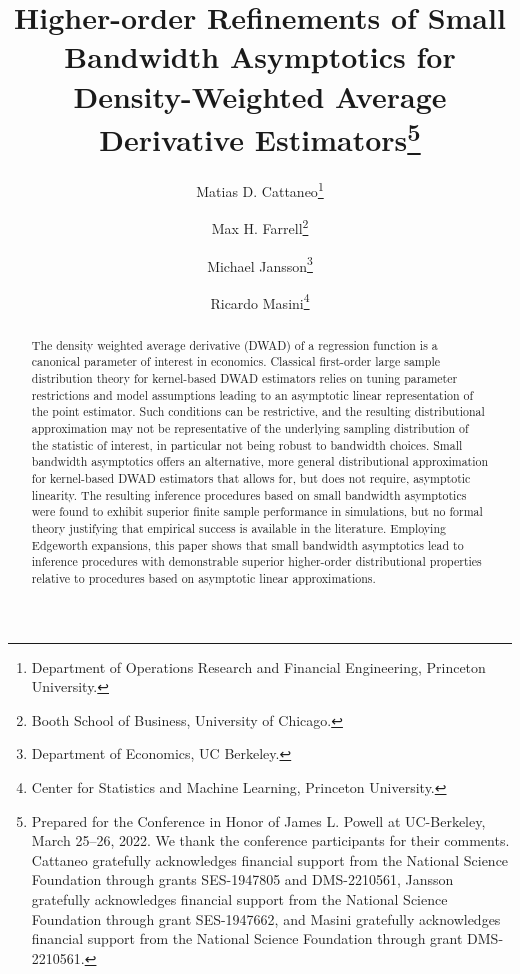 \documentclass[11pt]{article}
\numberwithin{equation}{section}
\theoremstyle{definition}
\begin{document}
\title{\vspace{-0.0in} Higher-order Refinements of Small Bandwidth Asymptotics for Density-Weighted Average Derivative Estimators\thanks{Prepared for the Conference in Honor of James L. Powell at UC-Berkeley, March 25--26, 2022. We thank the conference participants for their comments. Cattaneo gratefully acknowledges financial support from the National Science Foundation through grants SES-1947805 and DMS-2210561, Jansson gratefully acknowledges financial support from the National Science Foundation through grant SES-1947662, and Masini gratefully acknowledges financial support from the National Science Foundation through grant DMS-2210561.}
\bigskip }
\author{Matias D. Cattaneo\thanks{Department of Operations Research and Financial Engineering, Princeton University.} \and
	    Max H. Farrell\thanks{Booth School of Business, University of Chicago.} \and
	    Michael Jansson\thanks{Department of Economics, UC Berkeley.} \and
	    Ricardo Masini\thanks{Center for Statistics and Machine Learning, Princeton University.}}
\maketitle


\begin{abstract}
    The density weighted average derivative (DWAD) of a regression function is a canonical parameter of interest in economics. Classical first-order large sample distribution theory for kernel-based DWAD estimators relies on tuning parameter restrictions and model assumptions leading to an asymptotic linear representation of the point estimator. Such conditions can be restrictive, and the resulting distributional approximation may not be representative of the underlying sampling distribution of the statistic of interest, in particular not being robust to bandwidth choices. Small bandwidth asymptotics offers an alternative, more general distributional approximation for kernel-based DWAD estimators that allows for, but does not require, asymptotic linearity. The resulting inference procedures based on small bandwidth asymptotics were found to exhibit superior finite sample performance in simulations, but no formal theory justifying that empirical success is available in the literature. Employing Edgeworth expansions, this paper shows that small bandwidth asymptotics lead to inference procedures with demonstrable superior higher-order distributional properties relative to procedures based on asymptotic linear approximations.
\end{abstract}
\end{document}
